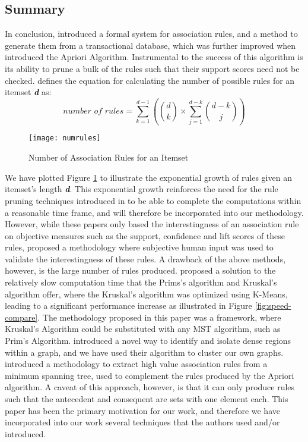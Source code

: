 \subsection{Summary}
In conclusion,  introduced a formal system for association rules, and a method to generate them from a transactional database, which was further improved when  introduced the Apriori Algorithm.
Instrumental to the success of this algorithm is its ability to prune a bulk of the rules such that their support scores need not be checked.  defines the equation for calculating the number of possible rules for an itemset \textbf{\textit{d}} as:
\[
\textit{number of rules} = \sum\limits_{k=1}^{d-1} \left(\binom{d}{k} \times \sum\limits_{j=1}^{d-k}\binom{d-k}{j}  \right)
\]
\begin{figure}[H]
\centering
\texttt{[image: numrules]}
\caption{Number of Association Rules for an Itemset}
\label{fig:numrules}
\end{figure}
We have plotted Figure \ref{fig:numrules} to illustrate the exponential growth of rules given an itemset's length \textbf{\textit{d}}.
This exponential growth reinforces the need for the rule pruning techniques introduced in  to be able to complete the computations within a reasonable time frame, and will therefore be incorporated into our methodology.
However, while these papers only based the interestingness of an association rule on objective measures such as the support, confidence and lift scores of these rules,  proposed a methodology where subjective human input was used to validate the interestingness of these rules. A drawback of the above methods, however, is the large number of rules produced.
 proposed a solution to the relatively slow computation time that the Prims's algorithm and Kruskal's algorithm offer, where the Kruskal's algorithm was optimized using K-Means, leading to a significant performance increase as illustrated in Figure \ref{fig:speed-compare}. The methodology proposed in this paper was a framework, where Kruskal's Algorithm could be substituted with any MST algorithm, such as Prim's Algorithm.
 introduced a novel way to identify and isolate dense regions within a graph, and we have used their algorithm to cluster our own graphs.
 introduced a methodology to extract high value association rules from a minimum spanning tree, used to complement the rules produced by the Apriori algorithm. A caveat of this approach, however, is that it can only produce rules such that the antecedent and consequent are sets with one element each. This paper has been the primary motivation for our work, and therefore we have incorporated into our work several techniques that the authors used and/or introduced.
